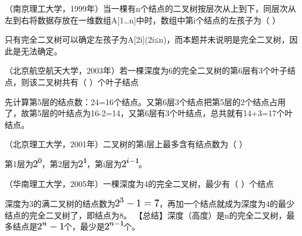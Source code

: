 \question （南京理工大学，1999年）当一棵有n个结点的二叉树按层次从上到下，同层次从左到右将数据存放在一维数组A{[}1\ldots{}n{]}中时，数组中第i个结点的左孩子为（
）
\par{}
\begin{solution}只有完全二叉树可以确定左孩子为A{[}2i{]}(2i≤n)，而本题并未说明是完全二叉树，因此是无法确定。
\end{solution}
\question （北京航空航天大学，2003年）若一棵深度为6的完全二叉树的第6层有3个叶子结点，则该二叉树共有（
）个叶子结点
\par{}
\begin{solution}先计算第5层的结点数：24=16个结点。又第6层3个结点把第5层的2个结点占用了，故第5层的叶结点为16-2=14，又第6层有3个叶结点，总共就有14+3=17个叶结点。
\end{solution}
\question （北京理工大学，2001年）二叉树的第i层上最多含有结点数为（ ）
\par\fourch{}{}{\textcolor{red}{}}{}
\begin{solution}第1层为\includegraphics[width=0.14583in,height=0.15625in]{texmath/2f67ff5Cdpi7B3507D25E0}，第2层为\includegraphics[width=0.14583in,height=0.15625in]{texmath/3177ee5Cdpi7B3507D25E1}，第i层为\includegraphics[width=0.30208in,height=0.15625in]{texmath/4c66015Cdpi7B3507D25E7Bi-17D}。
\end{solution}
\question （华南理工大学，2005年）一棵深度为4的完全二叉树，最少有（ ）个结点
\par{}
\begin{solution}深度为3的满二叉树的结点数为\includegraphics[width=0.78125in,height=0.16667in]{texmath/1f3b305Cdpi7B3507D25E3-13D7}，再加一个结点就成为深度为4的最少结点的完全二叉树了，即结点为8。
【总结】深度（高度）是n的完全二叉树，最多结点是\includegraphics[width=0.46875in,height=0.13542in]{texmath/9438eb5Cdpi7B3507D25En-1}个，最少是\includegraphics[width=0.33333in,height=0.15625in]{texmath/1dcd255Cdpi7B3507D25E7Bn-17D}个。
\end{solution}
